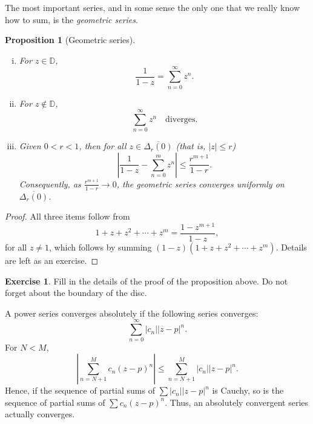 \documentclass[12pt,openany]{book}
\newcommand{\sabs}[1]{\lvert {#1} \rvert}
\newcommand{\abs}[1]{\left\lvert {#1} \right\rvert}
\newcommand{\D}{{\mathbb{D}}}
\newcommand{\myindex}[1]{#1\index{#1}}
\theoremstyle{plain}
\newtheorem{prop}[thm]{Proposition}
\theoremstyle{remark}
\theoremstyle{definition}
\newenvironment{exbox}{%
    \def\FrameCommand{\vrule width 1pt \relax\hspace{10pt}}%
    \MakeFramed{\advance\hsize-\width\FrameRestore}%
}{%
    \endMakeFramed
}
\theoremstyle{exercise}
\newtheorem{exercise}{Exercise}[section]
\theoremstyle{example}
\begin{document}
The most important series, and in some sense the only one that we really
know how to sum, is the \emph{\myindex{geometric series}}.

\begin{prop}[Geometric series]
\leavevmode
\begin{enumerate}[(i)]
\item For $z \in \D$,
\begin{equation*}
\frac{1}{1-z} = \sum_{n=0}^\infty z^n .
\end{equation*}
\item For $z \not\in \D$,
\begin{equation*}
\sum_{n=0}^\infty z^n \quad \text{diverges.}
\end{equation*}
\item
Given $0 < r < 1$, then for all $z \in \overline{\Delta_r(0)}$
(that is, $\sabs{z} \leq r$)
\begin{equation*}
\abs{\frac{1}{1-z} - \sum_{n=0}^m z^n}
\leq \frac{r^{m+1}}{1-r} .
\end{equation*}
Consequently,
as $\frac{r^{m+1}}{1-r} \to 0$,
the geometric series converges uniformly
on $\overline{\Delta_r(0)}$.
\end{enumerate}
\end{prop}

\begin{proof}
All three items follow from
\begin{equation*}
1+z+z^2+\cdots+z^m = \frac{1-z^{m+1}}{1-z} ,
\end{equation*}
for all $z \not= 1$, which follows by summing 
$(1-z)(1+z+z^2+\cdots+z^m)$.  Details are left as an exercise.
\end{proof}

\begin{exbox}
\begin{exercise}
Fill in the details of the proof of the proposition above.  Do not forget
about the boundary of the disc.
\end{exercise}
\end{exbox}

A power series converges absolutely if the following series converges:
\begin{equation*}
\sum_{n=0}^\infty \sabs{c_n} \sabs{z-p}^n .
\end{equation*}
For $N < M$,
\begin{equation*}
\abs{\sum_{n=N+1}^M c_n {(z-p)}^n}
\leq
\sum_{n=N+1}^M \sabs{c_n} \sabs{z-p}^n.
\end{equation*}
Hence, if the sequence of partial sums of 
$\sum \sabs{c_n} \sabs{z-p}^n$ is Cauchy, so is the sequence
of partial sums of $\sum c_n {(z-p)}^n$.  Thus,
an absolutely convergent series
actually converges.
\end{document}
